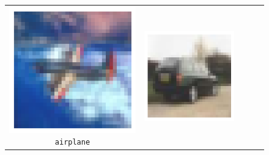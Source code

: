 \begin{figure}[h]
  \begin{tabular}{ccccc}
    \begin{minipage}[b]{0.15\linewidth}
      \includegraphics[width=\linewidth]{figures/cifar-images/airplane.png}
      \centering\scriptsize\texttt{airplane}
    \end{minipage} &
    \begin{minipage}[b]{0.15\linewidth}
      \includegraphics[width=\linewidth]{figures/cifar-images/automobile.png}

\end{minipage}
\end{tabular}
\end{figure}
